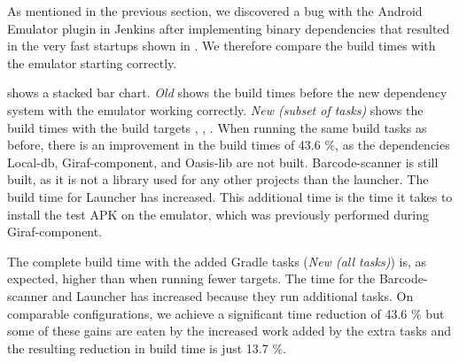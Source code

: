 As mentioned in the previous section, we discovered a bug with the Android Emulator plugin in Jenkins after implementing binary dependencies that resulted in the very fast startups shown in . We therefore compare the build times with the emulator starting correctly.

 shows a stacked bar chart. \emph{Old} shows the build times before the new dependency system with the emulator working correctly. \emph{New (subset of tasks)} shows the build times with the build targets , , . When running the same build tasks as before, there is an improvement in the build times of 43.6 \%, as the dependencies Local-db, Giraf-component, and Oasis-lib are not built. Barcode-scanner is still built, as it is not a library used for any other projects than the launcher. The build time for Launcher has increased. This additional time is the time it takes to install the test APK on the emulator, which was previously performed during Giraf-component.

The complete build time with the added Gradle tasks (\emph{New (all tasks)}) is, as expected, higher than when running fewer targets. The time for the Barcode-scanner and Launcher has increased because they run additional tasks. On comparable configurations, we achieve a significant time reduction of 43.6 \% but some of these gains are eaten by the increased work added by the extra tasks and the resulting reduction in build time is just 13.7 \%.

